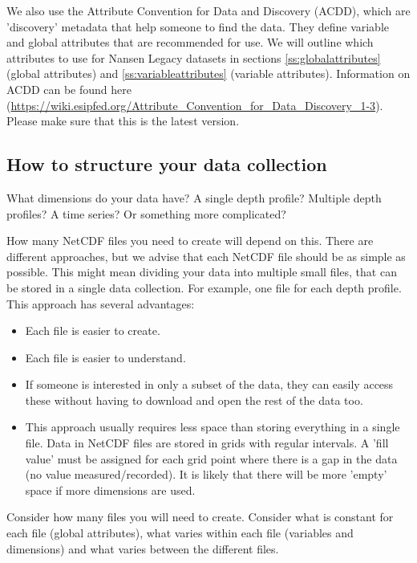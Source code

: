 \documentclass[a4paper,english, 11pt]{article}
\begin{document}
We also use the Attribute Convention for Data and Discovery (ACDD), which are 'discovery' metadata that help someone to find the data. They define variable and global attributes that are recommended for use. We will outline which attributes to use for Nansen Legacy datasets in sections \ref{ss:globalattributes} (global attributes) and \ref{ss:variableattributes} (variable attributes). Information on ACDD can be found here (\href{https://wiki.esipfed.org/Attribute_Convention_for_Data_Discovery_1-3}{https://wiki.esipfed.org/Attribute\_Convention\_for\_Data\_Discovery\_1-3}). Please make sure that this is the latest version.

\subsection{How to structure your data collection}
\label{ss:structurecollection}

What dimensions do your data have? A single depth profile? Multiple depth profiles? A time series? Or something more complicated?

How many NetCDF files you need to create will depend on this. There are different approaches, but we advise that each NetCDF file should be as simple as possible. This might mean dividing your data into multiple small files, that can be stored in a single data collection. For example, one file for each depth profile. This approach has several advantages:

\begin{itemize}
\item Each file is easier to create.
\item Each file is easier to understand.
\item If someone is interested in only a subset of the data, they can easily access these without having to download and open the rest of the data too.
\item This approach usually requires less space than storing everything in a single file. Data in NetCDF files are stored in grids with regular intervals. A 'fill value' must be assigned for each grid point where there is a gap in the data (no value measured/recorded). It is likely that there will be more 'empty' space if more dimensions are used. 
\end{itemize}   

Consider how many files you will need to create. Consider what is constant for each file (global attributes), what varies within each file (variables and dimensions) and what varies between the different files.
\end{document}

